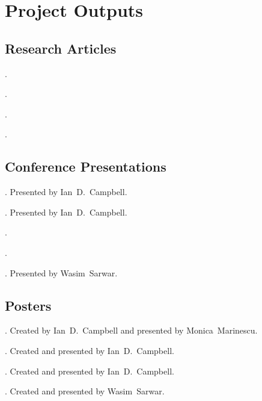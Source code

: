 
\graphicspath{{chapters/layer_opt/figures/}}
\chapter{Project Outputs}

\section*{Research Articles}

\begin{enumerate}[label={[\arabic*]}]
    \item {}.
    \item {}.
    \item {}.
    \item {}.
\end{enumerate}

\section*{Conference Presentations}

\begin{enumerate}[label={[\arabic*]}]
    \item {}. Presented by \mbox{Ian D.\ Campbell}.
    \item {}. Presented by \mbox{Ian D.\ Campbell}.
    \item {}.
    \item {}.
    \item {}. Presented by \mbox{Wasim Sarwar}.
\end{enumerate}

\section*{Posters}

\begin{enumerate}[label={[\arabic*]}]
    \item {}. Created by \mbox{Ian D.\ Campbell} and presented by \mbox{Monica Marinescu}.
    \item {}. Created and presented by  \mbox{Ian D.\ Campbell}.
    \item {}. Created and presented by  \mbox{Ian D.\ Campbell}.
    \item {}. Created and presented by  \mbox{Wasim Sarwar}.
\end{enumerate}

